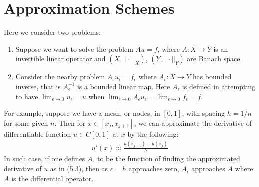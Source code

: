 \documentclass[11pt]{book}
\theoremstyle{break}
\theoremstyle{break}
\begin{document}
\section[Approximation Schemes]{\color{red} Approximation Schemes\color{black}}
Here we consider two problems:
\begin{enumerate}
\item Suppose we want to solve the problem $Au = f$, where $A:X \to Y$ is an invertible linear operator and $(X,||\cdot ||_X)$, $(Y,||\cdot ||_Y)$ are Banach space. 
\item Consider the nearby problem $A_{\epsilon}u_{\epsilon} = f_{\epsilon}$ where $A_{\epsilon}:X \to Y$ has bounded inverse, that is $A_{\epsilon}^{-1}$ is a bounded linear map. Here $A_{\epsilon}$ is defined in attempting to have $\lim_{\epsilon\to 0} u_\epsilon = u$ when $\lim_{\epsilon\to 0}A_\epsilon u_\epsilon =\lim_{\epsilon\to 0} f_\epsilon = f$. 
\end{enumerate}


For example, suppose we have a mesh, or nodes, in $[0,1]$, with spacing $h = 1/n$ for some given $n$. Then for $x \in [x_j, x_{j+1}]$, we can approximate the derivative of differentiable function $u\in C[0,1]$ at $x$ by the following:
\begin{align}
u'(x) \approx \frac{u(x_{j+1})- u(x_j)}{h}
\end{align}
In such case, if one defines $A_{\epsilon}$ to be the function of finding the approximated derivative of $u$ as in (5.3), then as $\epsilon = h$ approaches zero, $A_{\epsilon}$ approaches $A$ where $A$ is the differential operator. \\
\end{document}
